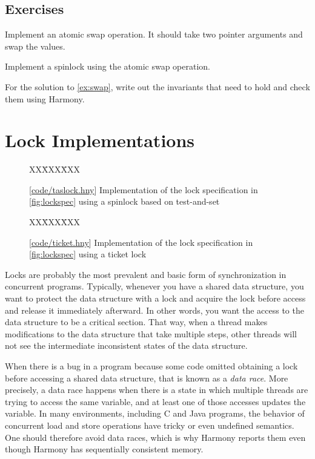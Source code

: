 \documentclass{report}
\newcommand{\harmonysource}[1]{
\begin{tabbing}
XX\=XXX\=XXX\kill
    
\end{tabbing}
}
\newcommand{\harmonylink}[1]{%
[\href{https://harmony.cs.cornell.edu/#1}{\underline{#1}}]%
}
\newenvironment{code}{
\tcolorbox
}{
\endtcolorbox
}
\begin{document}
\section*{Exercises}
\begin{problems}
\item Implement an atomic swap operation.  It should take two pointer arguments
and swap the values.
\item \label{ex:swap} Implement a spinlock using the atomic swap operation.
\item For the solution to \autoref{ex:swap},
write out the invariants that need to hold and check them using Harmony.
\end{problems}

\chapter{Lock Implementations}
\label{ch:synch}
%
%

\begin{figure}
\begin{code}
\harmonysource{taslock}
\end{code}
\caption{\harmonylink{code/taslock.hny} Implementation of the lock
specification in \autoref{fig:lockspec} using a spinlock based on
test-and-set}
\label{fig:tas2}
\end{figure}

\begin{figure}
\begin{code}
\harmonysource{ticket}
\end{code}
\caption{\harmonylink{code/ticket.hny} Implementation of the lock
specification in \autoref{fig:lockspec} using a ticket lock}
\label{fig:ticket}
\end{figure}

Locks are probably the most prevalent and basic form of synchronization
in concurrent programs.  Typically, whenever you have a shared data
structure, you want to protect the data structure with a lock and
acquire the lock before access and release it immediately afterward.
In other words, you want the access to the data structure to be a
critical section.
That way, when a thread makes modifications to the data structure that take
multiple steps, other threads will not see the intermediate inconsistent
states of the data structure.

%
%
When there is a bug in a program because some code omitted obtaining
a lock before accessing a shared data structure, that is known as a
\emph{data race}.
More precisely, a data race happens when there is a state in which multiple
threads are trying to access the same variable, and at least one of those
accesses updates the variable.
In many environments, including C and Java programs, the behavior of
concurrent load and store operations have tricky or even undefined
semantics.  One should therefore avoid data races, which is why Harmony
reports them even though Harmony has sequentially consistent memory.
\end{document}
